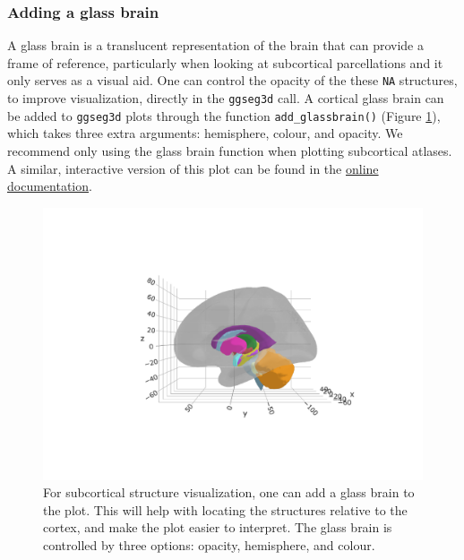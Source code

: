 \documentclass[fleqn,10pt]{wlpeerj} %
\newenvironment{Shaded}{\begin{snugshade}}{\end{snugshade}}
\newcommand{\CommentTok}[1]{\textcolor[rgb]{0.56,0.35,0.01}{\textit{#1}}}
\newcommand{\DataTypeTok}[1]{\textcolor[rgb]{0.13,0.29,0.53}{#1}}
\newcommand{\FloatTok}[1]{\textcolor[rgb]{0.00,0.00,0.81}{#1}}
\newcommand{\KeywordTok}[1]{\textcolor[rgb]{0.13,0.29,0.53}{\textbf{#1}}}
\newcommand{\NormalTok}[1]{#1}
\newcommand{\OperatorTok}[1]{\textcolor[rgb]{0.81,0.36,0.00}{\textbf{#1}}}
\newcommand{\StringTok}[1]{\textcolor[rgb]{0.31,0.60,0.02}{#1}}
\begin{document}
\hypertarget{adding-a-glass-brain}{%
\subsubsection{Adding a glass brain}\label{adding-a-glass-brain}}

A glass brain is a translucent representation of the brain that can provide a frame of reference,
particularly when looking at subcortical parcellations and it only serves as a visual aid.
One can control the opacity of the these \texttt{NA} structures, to improve visualization, directly in the \texttt{ggseg3d} call.
A cortical glass brain can be added to \texttt{ggseg3d} plots through the function \texttt{add\_glassbrain()} (Figure \ref{fig:figure9}), which takes three extra arguments: hemisphere, colour, and opacity.
We recommend only using the glass brain function when plotting subcortical atlases.
A similar, interactive version of this plot can be found in the \href{https://lcbc-uio.github.io/ggseg3d//articles/ggseg3d.html\#colours-1}{online documentation}.

\begin{Shaded}
\end{Shaded}



\begin{figure}[H]
\includegraphics[width=0.6\linewidth]{msc_ggseg_files/figure-latex/figure9} \caption{For subcortical structure visualization, one can add a glass brain to the plot. This will help with locating the structures relative to the cortex, and make the plot easier to interpret. The glass brain is controlled by three options: opacity, hemisphere, and colour.}\label{fig:figure9}
\end{figure}
\end{document}
